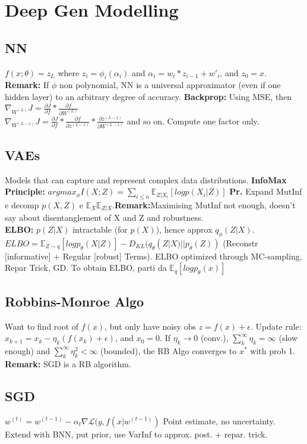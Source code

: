 \section*{Deep Gen Modelling}
\subsection*{NN}
$f(x;\theta)=z_L$ where $z_i=\phi_i(\alpha_i)$ and $\alpha_i=w_i*z_{i-1}+w'_i$, and $z_0 = x$.
\textbf{Remark:} If $\phi$ non polynomial, NN is a universal approximator (even if one hidden layer) to an arbitrary degree of accuracy.
\textbf{Backprop:} Using MSE, then $\nabla_{W^{(L)}} J=\frac{\partial J}{\partial f}*\frac{\partial f}{\partial W^{(L)}}$\\
$\nabla_{W^{(L-1)}} J=\frac{\partial J}{\partial f}*\frac{\partial f}{\partial z^{(L-1)}}*\frac{\partial z^{(L-1)}}{\partial W^{(L-1)}}$ and so on. Compute one factor only.

\subsection*{VAEs}
Models that can capture and represent complex data distributions.
\textbf{InfoMax Principle:} $argmax_\phi I(X;Z)=\sum_{i\le n}\mathbb E_{Z|X_i}[log p(X_i|Z)]$ \textbf{Pr.} Expand MutInf e decomp $p(X,Z)$ e $\mathbb E_{X}\mathbb E_{Z|X}$.\textbf{Remark:}Maximising MutInf not enough, doesn't say about disentanglement of X and Z and robustness.\\
\textbf{ELBO:} $p(Z|X)$ intractable (for $p(X)$), hence approx $q_\phi(Z|X)$. $ELBO=\mathbb E_{Z\sim q}[log p_\theta(X|Z)]-D_{KL}(q_\theta(Z|X)||p_\theta(Z))$ (Reconstr [informative] + Regular [robust] Terms). ELBO optimized through MC-sampling, Repar Trick, GD. To obtain ELBO, parti da $\mathbb E_q[logp_\theta(x)]$
\subsection*{Robbins-Monroe Algo}
Want to find root of $f(x)$, but only have noisy obs $z=f(x)+\epsilon$. Update rule: $x_{k+1}=x_k-\eta_k(f(x_k)+\epsilon)$, and $x_0=0$. If $\eta_k\to0$ (conv.), $\sum_k^\infty \eta_k=\infty$ (slow enough) and $\sum_k^\infty \eta_k^2<\infty$ (bounded), the RB Algo converges to $x^*$ with prob 1.
\textbf{Remark:} SGD is a RB algorithm.
\subsection*{SGD}
$w^{(t)}=w^{(t-1)}-\alpha_t\nabla\mathcal L(y, f(x|w^{(t-1)})$ Point estimate, no uncertainty. Extend with BNN, put prior, use VarInf to approx. post. + repar. trick.

